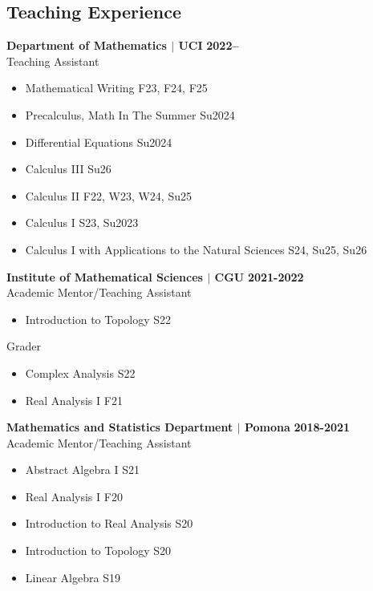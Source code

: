\documentclass[margin,line]{res}
\begin{document}
\begin{resume}







\section{\sc Teaching Experience}
{\bf Department of Mathematics $\mid$ UCI }\hfill {\bf2022--}\\
Teaching Assistant 
\begin{itemize}
  \renewcommand\labelitemi{--}
  \item Mathematical Writing \hfill {F23, F24, F25}
  \item Precalculus, Math In The Summer \hfill {Su2024}
  \item Differential Equations \hfill {Su2024}
  \item Calculus III \hfill {Su26}
  \item Calculus II \hfill {F22, W23, W24, Su25}
  \item Calculus I \hfill {S23, Su2023}
  \item Calculus I with Applications to the Natural Sciences \hfill {S24, Su25, Su26}
\end{itemize}

{\bf Institute of Mathematical Sciences $\mid$ CGU} \hfill {\bf2021-2022}\\
Academic Mentor/Teaching Assistant 
\begin{itemize}
  \renewcommand\labelitemi{--}
  \item Introduction to Topology \hfill {S22}
\end{itemize}
\vspace{-4mm}
Grader
\begin{itemize}
  \renewcommand\labelitemi{--}
  \item Complex Analysis \hfill {S22}
  \item Real Analysis I \hfill {F21}
\end{itemize}

 {\bf Mathematics and Statistics Department $\mid$ Pomona} \hfill {\bf2018-2021}\\
Academic Mentor/Teaching Assistant 
\begin{itemize}
  \renewcommand\labelitemi{--}
  \item Abstract Algebra I \hfill {S21}
  \item Real Analysis I \hfill {F20}
  \item Introduction to Real Analysis \hfill {S20}
  \item Introduction to Topology \hfill {S20}
  \item Linear Algebra \hfill {S19}
\end{itemize}



\end{resume}
\end{document}
